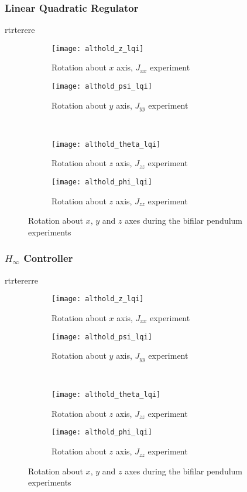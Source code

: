 \subsubsection{Linear Quadratic Regulator}
rtrterere
\begin{figure}[H]
\begin{subfigure}{.5\linewidth}
\centering
\texttt{[image: althold\_z\_lqi]}
\caption{Rotation about $x$ axis, $J_{xx}$ experiment}
\label{fig:althold_z_lqi}
\end{subfigure}%
\begin{subfigure}{.5\linewidth}
\centering
\texttt{[image: althold\_psi\_lqi]}
\caption{Rotation about $y$ axis, $J_{yy}$ experiment}
\label{fig:althold_psi_lqi}
\end{subfigure}\\[1ex]
\begin{subfigure}{0.5\linewidth}
\centering
\texttt{[image: althold\_theta\_lqi]}
\caption{Rotation about $z$ axis, $J_{zz}$ experiment}
\label{fig:althold_theta_lqi}
\end{subfigure}
\begin{subfigure}{0.5\linewidth}
\centering
\texttt{[image: althold\_phi\_lqi]}
\caption{Rotation about $z$ axis, $J_{zz}$ experiment}
\label{fig:althold_phi_lqi}
\end{subfigure}
\caption{Rotation about $x$, $y$ and $z$ axes during the bifilar pendulum experiments}
\label{fig:althold_lqi}
\end{figure}

\subsubsection{$H_\infty$ Controller}
rtrtererre

\begin{figure}[H]
\begin{subfigure}{.5\linewidth}
\centering
\texttt{[image: althold\_z\_lqi]}
\caption{Rotation about $x$ axis, $J_{xx}$ experiment}
\label{fig:althold_z_lqi}
\end{subfigure}%
\begin{subfigure}{.5\linewidth}
\centering
\texttt{[image: althold\_psi\_lqi]}
\caption{Rotation about $y$ axis, $J_{yy}$ experiment}
\label{fig:althold_psi_lqi}
\end{subfigure}\\[1ex]
\begin{subfigure}{0.5\linewidth}
\centering
\texttt{[image: althold\_theta\_lqi]}
\caption{Rotation about $z$ axis, $J_{zz}$ experiment}
\label{fig:althold_theta_lqi}
\end{subfigure}
\begin{subfigure}{0.5\linewidth}
\centering
\texttt{[image: althold\_phi\_lqi]}
\caption{Rotation about $z$ axis, $J_{zz}$ experiment}
\label{fig:althold_phi_lqi}
\end{subfigure}
\caption{Rotation about $x$, $y$ and $z$ axes during the bifilar pendulum experiments}
\label{fig:althold_lqi}
\end{figure}

